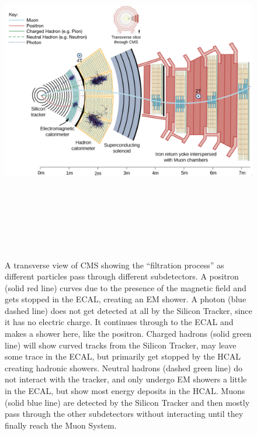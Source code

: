 \begin{figure}[pbth]
\centering
\includegraphics[width=15cm,height=15cm,keepaspectratio]{figures/cms/cms_transverse_particletrajectories_corrected.png}
    \caption{
    A transverse view of CMS showing the ``filtration process'' as different particles pass through different subdetectors.
    A positron (solid red line) curves due to the presence of the magnetic field and gets stopped in the ECAL, creating an EM shower.
    A photon (blue dashed line) does not get detected at all by the Silicon Tracker, since it has no electric charge.
    It continues through to the ECAL and makes a shower here, like the positron.
    Charged hadrons (solid green line) will show curved tracks from the Silicon Tracker, may leave some trace in the ECAL, but primarily get stopped by the HCAL creating hadronic showers.
    Neutral hadrons (dashed green line) do not interact with the tracker, and only undergo EM showers a little in the ECAL, but show most energy deposits in the HCAL.
    Muons (solid blue line) are detected by the Silicon Tracker and then mostly pass through the other subdetectors without interacting until they finally reach the Muon System.
}
\end{figure}
